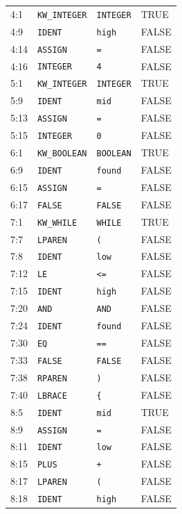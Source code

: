 \documentclass[11pt,a4paper]{article}
\newcommand{\token}[1]{\texttt{#1}}
\newcommand{\codeinline}[1]{\texttt{#1}}
\begin{document}
\begin{longtable}{L{23mm} L{42mm} L{47mm} L{32mm}}
4:1 & \token{KW\_INTEGER} & \codeinline{INTEGER} & TRUE \\
4:9 & \token{IDENT} & \codeinline{high} & FALSE \\
4:14 & \token{ASSIGN} & \codeinline{=} & FALSE \\
4:16 & \token{INTEGER} & \codeinline{4} & FALSE \\
5:1 & \token{KW\_INTEGER} & \codeinline{INTEGER} & TRUE \\
5:9 & \token{IDENT} & \codeinline{mid} & FALSE \\
5:13 & \token{ASSIGN} & \codeinline{=} & FALSE \\
5:15 & \token{INTEGER} & \codeinline{0} & FALSE \\
6:1 & \token{KW\_BOOLEAN} & \codeinline{BOOLEAN} & TRUE \\
6:9 & \token{IDENT} & \codeinline{found} & FALSE \\
6:15 & \token{ASSIGN} & \codeinline{=} & FALSE \\
6:17 & \token{FALSE} & \codeinline{FALSE} & FALSE \\
7:1 & \token{KW\_WHILE} & \codeinline{WHILE} & TRUE \\
7:7 & \token{LPAREN} & \codeinline{(} & FALSE \\
7:8 & \token{IDENT} & \codeinline{low} & FALSE \\
7:12 & \token{LE} & \codeinline{<=} & FALSE \\
7:15 & \token{IDENT} & \codeinline{high} & FALSE \\
7:20 & \token{AND} & \codeinline{AND} & FALSE \\
7:24 & \token{IDENT} & \codeinline{found} & FALSE \\
7:30 & \token{EQ} & \codeinline{==} & FALSE \\
7:33 & \token{FALSE} & \codeinline{FALSE} & FALSE \\
7:38 & \token{RPAREN} & \codeinline{)} & FALSE \\
7:40 & \token{LBRACE} & \codeinline{\{} & FALSE \\
8:5 & \token{IDENT} & \codeinline{mid} & TRUE \\
8:9 & \token{ASSIGN} & \codeinline{=} & FALSE \\
8:11 & \token{IDENT} & \codeinline{low} & FALSE \\
8:15 & \token{PLUS} & \codeinline{+} & FALSE \\
8:17 & \token{LPAREN} & \codeinline{(} & FALSE \\
8:18 & \token{IDENT} & \codeinline{high} & FALSE \\

\end{longtable}
\end{document}
